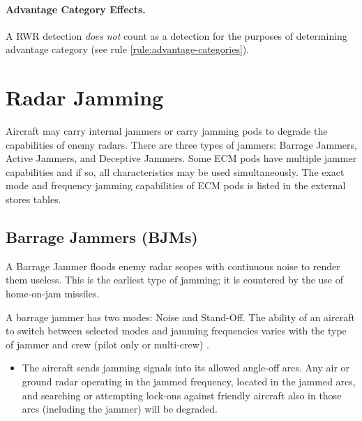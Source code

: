 \begin{advancedrules}
\paragraph{Advantage Category Effects.} A RWR detection \emph{does not} count as a detection for the purposes of determining advantage category (see rule \ref{rule:advantage-categories}).

\section{Radar Jamming}
\label{rule:radar-jamming}

Aircraft may carry internal jammers or carry jamming pods to degrade the capabilities of enemy radars. There are three types of jammers: Barrage Jammers, Active Jammers, and Deceptive Jammers. Some ECM pods have multiple jammer capabilities and if so, all characteristics may be used simultaneously. The exact mode and frequency jamming capabilities of ECM pods is listed in the external stores tables. 


\subsection{Barrage Jammers (BJMs)}
\label{rule:home-on-jam-seeker}


A Barrage Jammer floods enemy radar scopes with continuous noise to render them useless. This is the earliest type of jamming; it is countered by the use of home-on-jam missiles.

A barrage jammer has two modes: Noise and Stand-Off. The ability of an aircraft to switch between selected modes and jamming frequencies varies with the type of jammer and crew (pilot only or multi-crew) . 

\begin{itemize}

    \item {} The aircraft sends jamming signals into its allowed angle-off arcs. Any air or ground radar operating in the jammed frequency, located in the jammed arcs, and searching or attempting lock-ons against friendly aircraft also in those arcs (including the jammer) will be degraded.


\end{itemize}
\end{advancedrules}
